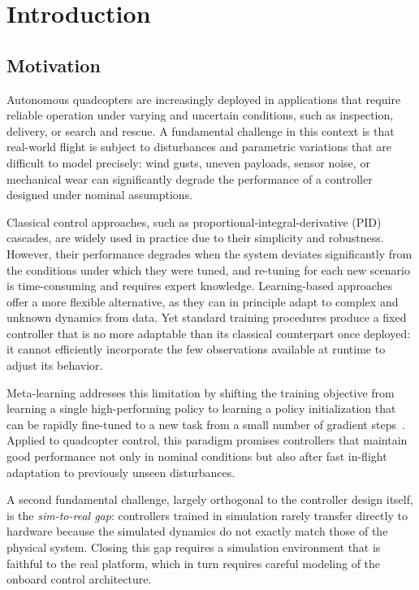 \documentclass[11pt,a4paper]{article}
\theoremstyle{remark}
\numberwithin{equation}{section}
\begin{document}

\tableofcontents
\cleardoublepage
{}

\section{Introduction}

\subsection{Motivation}

Autonomous quadcopters are increasingly deployed in applications that require reliable operation
under varying and uncertain conditions, such as inspection, delivery, or search and rescue.
A fundamental challenge in this context is that real-world flight is subject to disturbances
and parametric variations that are difficult to model precisely: wind gusts, uneven payloads,
sensor noise, or mechanical wear can significantly degrade the performance of a controller
designed under nominal assumptions.

Classical control approaches, such as proportional-integral-derivative (PID) cascades, are
widely used in practice due to their simplicity and robustness. However, their performance
degrades when the system deviates significantly from the conditions under which they were
tuned, and re-tuning for each new scenario is time-consuming and requires expert knowledge.
Learning-based approaches offer a more flexible alternative, as they can in principle adapt
to complex and unknown dynamics from data. Yet standard training procedures produce a fixed
controller that is no more adaptable than its classical counterpart once deployed: it cannot
efficiently incorporate the few observations available at runtime to adjust its behavior.

Meta-learning addresses this limitation by shifting the training objective from learning a
single high-performing policy to learning a policy initialization that can be rapidly
fine-tuned to a new task from a small number of gradient steps~\cite{finn2017maml}.
Applied to quadcopter control, this paradigm promises controllers that maintain good
performance not only in nominal conditions but also after fast in-flight adaptation to
previously unseen disturbances.

A second fundamental challenge, largely orthogonal to the controller design itself, is the
\emph{sim-to-real gap}: controllers trained in simulation rarely transfer directly to hardware
because the simulated dynamics do not exactly match those of the physical system.
Closing this gap requires a simulation environment that is faithful to the real platform,
which in turn requires careful modeling of the onboard control architecture.
\end{document}
